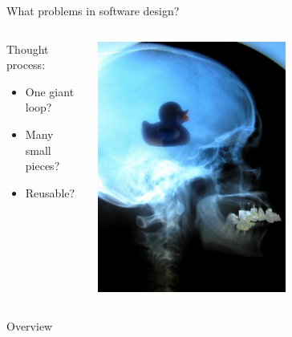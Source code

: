 \documentclass[aspectratio=43]{beamer}
\begin{document}
\begin{frame}{What problems in software design?}
\begin{columns}
	\begin{column}{0.55\textwidth}
Thought process:
		\begin{itemize}
			\item One giant loop?
                        \item Many small pieces?
                        \item Reusable? 
		\end{itemize} 
        \end{column} 
        \begin{column}{0.45\textwidth} 
          \centering 
          \includegraphics[width=0.6\textwidth]{fig/duckie-brain.jpg} 
        \end{column}
\end{columns}

\end{frame}



\begin{frame}[label=overview]{Overview}
	\tableofcontents
\end{frame}
\end{document}
